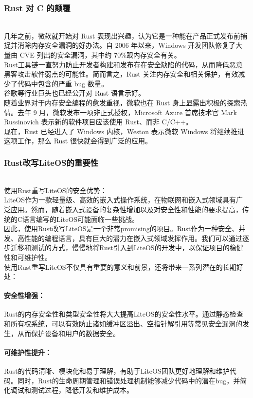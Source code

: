 \documentclass{ctexart}
\begin{document}
\subsubsection{Rust 对 C 的颠覆}\ \\
\indent 几年之前，微软就开始对 Rust 表现出兴趣，认为它是一种能在产品正式发布前捕捉并消除内存安全漏洞的好办法。自 2006 年以来，Windows 开发团队修复了大量由 CVE 列出的安全漏洞，其中约 70\%跟内存安全有关。\\
\indent Rust工具链一直努力防止开发者构建和发布存在安全缺陷的代码，从而降低恶意黑客攻击软件弱点的可能性。简而言之，Rust 关注内存安全和相关保护，有效减少了代码中包含的严重 bug 数量。\\
\indent 谷歌等行业巨头也已经公开对 Rust 语言示好。\\
\indent 随着业界对于内存安全编程的愈发重视，微软也在 Rust 身上显露出积极的探索热情。去年 9 月，微软发布一项非正式授权，Microsoft Azure 首席技术官 Mark Russinovich 表示新的软件项目应该使用 Rust、而非 C/C++。\\
\indent 现在，Rust 已经进入了 Windows 内核，Weston 表示微软 Windows 将继续推进这项工作，那么 Rust 很快就会得到广泛的应用。
\subsubsection{Rust改写LiteOS的重要性}\ \\
\indent 使用Rust重写LiteOS的安全优势：\\
\indent LiteOS作为一款轻量级、高效的嵌入式操作系统，在物联网和嵌入式领域具有广泛应用。然而，随着嵌入式设备的复杂性增加以及对安全性和性能的要求提高，传统的C语言编写的LiteOS可能面临一些挑战。\\
\indent 因此，使用Rust改写LiteOS是一个非常promising的项目。Rust作为一种安全、并发、高性能的编程语言，具有巨大的潜力在嵌入式领域发挥作用。我们可以通过逐步迁移和测试的方式，慢慢地将Rust引入到LiteOS的开发中，以保证项目的稳健性和可维护性。\\
\indent 使用Rust重写LiteOS不仅具有重要的意义和前景，还将带来一系列潜在的长期好处：
\paragraph{安全性增强：}
 Rust的内存安全性和类型安全性将大大提高LiteOS的安全性水平。通过静态检查和所有权系统，可以有效防止诸如缓冲区溢出、空指针解引用等常见安全漏洞的发生，从而保护设备和用户的数据安全。
\paragraph{可维护性提升：}
 Rust的代码清晰、模块化和易于理解，有助于LiteOS团队更好地理解和维护代码。同时，Rust的生命周期管理和错误处理机制能够减少代码中的潜在bug，并简化调试和测试过程，降低开发和维护成本。
\end{document}
